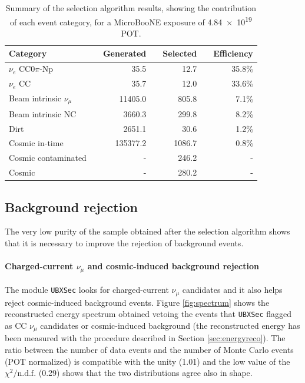 \documentclass[a4paper]{article}
\begin{document}
\begin{table}[htbp]
   \centering
   \begin{tabular}{llrrrrr}
     \toprule
     Category & \phantom{a} & Generated & \phantom{a} & Selected & \phantom{a} & Efficiency \\
     \midrule

     $\nu_{e}$ CC0$\pi$-Np       & & 35.5     & & 12.7   & & 35.8\%\\
     $\nu_{e}$ CC                & & 35.7     & & 12.0   & & 33.6\%\\
     Beam intrinsic $\nu_{\mu}$  & & 11405.0  & & 805.8  & & 7.1\%\\
     Beam intrinsic NC           & & 3660.3   & & 299.8  & & 8.2\%\\
     Dirt                        & & 2651.1   & & 30.6   & & 1.2\%\\
     Cosmic in-time              & & 135377.2 & & 1086.7 & & 0.8\%\\
     Cosmic contaminated         & & -        & & 246.2  & & -\\
     Cosmic                      & & -        & & 280.2  & & -\\

     \bottomrule
   \end{tabular}
   \caption{Summary of the selection algorithm results, showing the contribution of each event category, for a MicroBooNE exposure of \num{4.84e19} POT.}\label{tab:result}
\end{table}

\subsection{Background rejection}\label{sec:cuts}
The very low purity of the sample obtained after the selection algorithm shows that it is necessary to improve the rejection of background events. 

\paragraph{Charged-current $\nu_{\mu}$ and cosmic-induced background rejection}
The module \texttt{UBXSec} \cite{ubxsec} looks for charged-current $\nu_{\mu}$ candidates and it also helps reject cosmic-induced background events.  Figure \ref{fig:spectrum} shows the reconstructed energy spectrum obtained vetoing the events that \texttt{UBXSec} flagged as CC $\nu_{\mu}$ candidates or cosmic-induced background (the reconstructed energy has been measured with the procedure described in Section \ref{sec:energyreco}). The ratio between the number of data events and the number of Monte Carlo events (POT normalized) is compatible with the unity (1.01) and the low value of the $\chi^{2} / \mathrm{n.d.f.}$ (0.29) shows that the two distributions agree also in shape.
\end{document}
